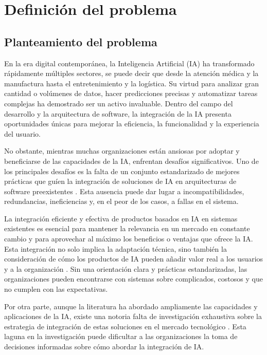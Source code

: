 \section{Definición del problema}

\subsection{Planteamiento del problema}
En la era digital contemporánea, la Inteligencia Artificial (IA) ha transformado rápidamente múltiples sectores, se puede decir que desde la atención médica y la manufactura hasta el entretenimiento y la logística. Su virtud para analizar gran cantidad o volúmenes de datos, hacer predicciones precisas y automatizar tareas complejas ha demostrado ser un activo invaluable. Dentro del campo del desarrollo y la arquitectura de software, la integración de la IA presenta oportunidades únicas para mejorar la eficiencia, la funcionalidad y la experiencia del usuario.

No obstante, mientras muchas organizaciones están ansiosas por adoptar y beneficiarse de las capacidades de la IA, enfrentan desafíos significativos. Uno de los principales desafíos es la falta de un conjunto estandarizado de mejores prácticas que guíen la integración de soluciones de IA en arquitecturas de software preexistentes \citep{Wang2016ImplementingOutlook}. Esta ausencia puede dar lugar a incompatibilidades, redundancias, ineficiencias y, en el peor de los casos, a fallas en el sistema.

La integración eficiente y efectiva de productos basados en IA en sistemas existentes es esencial para mantener la relevancia en un mercado en constante cambio y para aprovechar al máximo los beneficios o ventajas que ofrece la IA. Esta integración no solo implica la adaptación técnica, sino también la consideración de cómo los productos de IA pueden añadir valor real a los usuarios y a la organización \citep{Cui2022ConstructionIntelligence}. Sin una orientación clara y prácticas estandarizadas, las organizaciones pueden encontrarse con sistemas sobre complicados, costosos y que no cumplen con las expectativas.

Por otra parte, aunque la literatura ha abordado ampliamente las capacidades y aplicaciones de la IA, existe una notoria falta de investigación exhaustiva sobre la estrategia de integración de estas soluciones en el mercado tecnológico \citep{Cui2022ConstructionIntelligence}. Esta laguna en la investigación puede dificultar a las organizaciones la toma de decisiones informadas sobre cómo abordar la integración de IA.

